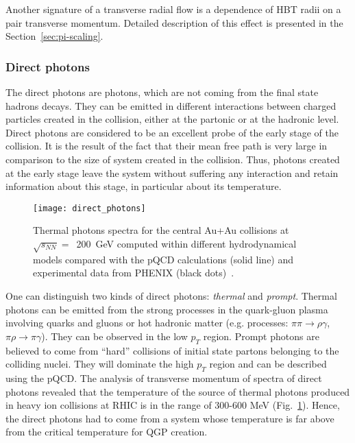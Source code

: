         Another signature of a transverse radial flow is a dependence of HBT radii on a pair transverse momentum.
        Detailed description of this effect is presented in the Section~\ref{sec:pi-scaling}.
      \subsubsection{Direct photons}
        The direct photons are photons, which are not coming from the final state hadrons decays.
        They can be emitted in different interactions between charged particles created in the collision, either at the partonic or at the hadronic level.
        Direct photons are considered to be an excellent probe of the early stage of the collision.
        It is the result of the fact that their mean free path is very large in comparison to the size of system created in the collision.
        Thus, photons created at the early stage leave the system without suffering any interaction and retain information about this stage, in particular about its temperature.

        \begin{figure}[b]
          \centering
          \texttt{[image: direct\_photons]}
          \caption{Thermal photons spectra for the central Au+Au collisions at $\sqrt{s_{NN}}=$~200~GeV computed within different hydrodynamical models compared with the pQCD calculations (solid line) and experimental data from PHENIX (black dots)~\cite{rapp_xu}.}
          \label{fig:direct_photons}
        \end{figure}
        One can distinguish two kinds of direct photons: \textit{thermal} and \textit{prompt}.
        Thermal photons can be emitted from the strong processes in the quark-gluon plasma involving quarks and gluons or hot hadronic matter (e.g. processes: $\pi\pi \to \rho \gamma$, $\pi\rho \to \pi \gamma$).
        They can be observed in the low $p_T$ region.
        Prompt photons are believed to come from ``hard'' collisions of initial state partons belonging to the colliding nuclei.
        They will dominate the high $p_T$ region and can be described using the pQCD.
        The analysis of transverse momentum of spectra of direct photons revealed that the temperature of the source of thermal photons produced in heavy ion collisions at RHIC is in the range of 300-600 MeV (Fig.~\ref{fig:direct_photons}).
        Hence, the direct photons had to come from a system whose temperature is far above from the critical temperature for QGP creation.

